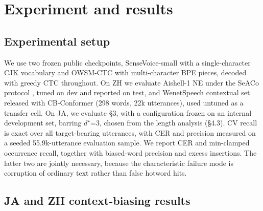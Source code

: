 \documentclass{article}
\begin{document}
\section{Experiment and results}

\subsection{Experimental setup}
We use two frozen public checkpoints, SenseVoice-small \cite{an2024funaudiollm} with a single-character CJK vocabulary and OWSM-CTC \cite{peng2024owsm} with multi-character BPE pieces, decoded with greedy CTC throughout. On ZH we evaluate Aishell-1 \cite{bu2017aishell} NE under the SeACo protocol \cite{shi2024seaco}, tuned on dev and reported on test, and WenetSpeech contextual set \cite{zhang2022wenetspeech} released with CB-Conformer \cite{xu2023cb} (298 words, 22k utterances), used untuned as a transfer cell. On JA, we evaluate §3, with a configuration frozen on an internal development set, barring $d^\star$=3, chosen from the length analysis (§4.3). CV recall is exact over all target-bearing utterances, with CER and precision measured on a seeded 55.9k-utterance evaluation sample. We report CER and min-clamped occurrence recall, together with biased-word precision and excess insertions. The latter two are jointly necessary, because the characteristic failure mode is corruption of ordinary text rather than false hotword hits.


\subsection{JA and ZH context-biasing results}
\end{document}
